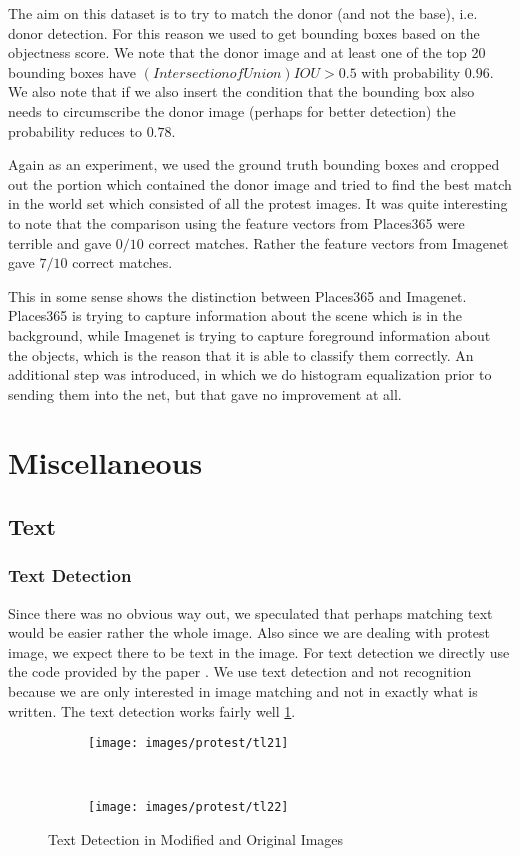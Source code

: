 \documentclass{article}
\begin{document}
The aim on this dataset is to try to match the donor (and not the base), i.e. donor detection. For this reason we used\cite{6126456} to get bounding boxes based on the objectness score. We note that the donor image and at least one of the top 20 bounding boxes have $(Intersection of Union)IOU > 0.5$ with probability $0.96$. We also note that if we also insert the condition that the bounding box also needs to circumscribe the donor image (perhaps for better detection) the probability reduces to $0.78$.

Again as an experiment, we used the ground truth bounding boxes and cropped out the portion which contained the donor image and tried to find the best match in the world set which consisted of all the protest images. It was quite interesting to note that the comparison using the feature vectors from Places365 were terrible and gave $0/10$ correct matches. Rather the feature vectors from Imagenet gave $7/10$ correct matches.

This in some sense shows the distinction between Places365 and Imagenet. Places365 is trying to capture information about the scene which is in the background, while Imagenet is trying to capture foreground information about the objects, which is the reason that it is able to classify them correctly. An additional step was introduced, in which we do histogram equalization prior to sending them into the net, but that gave no improvement at all.
\section{Miscellaneous}
\subsection{Text}
\subsubsection{Text Detection}
Since there was no obvious way out, we speculated that perhaps matching text would be easier rather the whole image. Also since we are dealing with protest image, we expect there to be text in the image. For text detection we directly use the code provided by the paper \cite{DBLP:journals/corr/TianHHH016}. We use text detection and not recognition because we are only interested in image matching and not in exactly what is written. The text detection works fairly well \ref{fig:pr_imgs}.

\begin{figure}[H]
  \centering
  \begin{subfigure}[H]{0.4\linewidth}
    \texttt{[image: images/protest/tl21]}
  \end{subfigure}
  ~
  \begin{subfigure}[H]{0.4\linewidth}
    \texttt{[image: images/protest/tl22]}
  \end{subfigure}
  \caption{Text Detection in Modified and Original Images}
  \label{fig:pr_imgs}
\end{figure}
\end{document}
